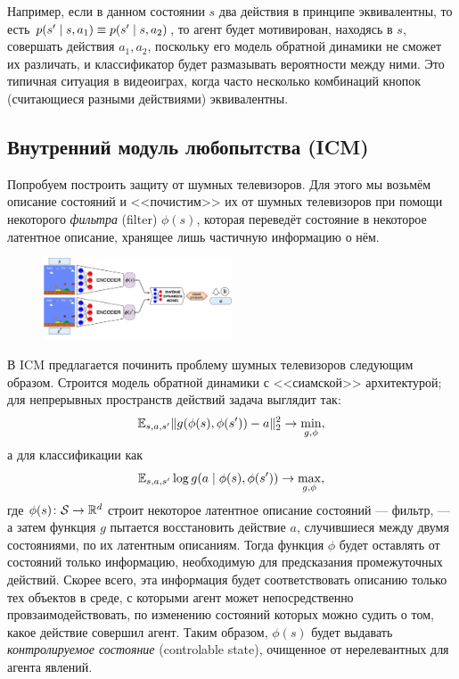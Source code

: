 \begin{example}
Например, если в данном состоянии $s$ два действия в принципе эквивалентны, то есть $p(s' \HM\mid s, a_1) \HM\equiv p(s' \HM\mid s, a_2)$, то агент будет мотивирован, находясь в $s$, совершать действия $a_1, a_2$, поскольку его модель обратной динамики не сможет их различать, и классификатор будет размазывать вероятности между ними. Это типичная ситуация в видеоиграх, когда часто несколько комбинаций кнопок (считающиеся разными действиями) эквивалентны.
\end{example}

\subsection{Внутренний модуль любопытства (ICM)}

Попробуем построить защиту от шумных телевизоров. Для этого мы возьмём описание состояний и <<почистим>> их от шумных телевизоров при помощи некоторого \emph{фильтра} (filter) $\phi(s)$, которая переведёт состояние в некоторое латентное описание, хранящее лишь частичную информацию о нём.

\begin{figure}
\centering
\includegraphics[width=0.5\textwidth]{Images/inversemodel.png}
\vspace{-0.7cm}
\end{figure}

В ICM предлагается починить проблему шумных телевизоров следующим образом. Строится модель обратной динамики с <<сиамской>> архитектурой; для непрерывных пространств действий задача выглядит так:
$$\mathbb{E}_{s, a, s'} \|g(\phi(s), \phi(s')) - a\|^2_2 \to \min_{g, \phi},$$
а для классификации как
$$\mathbb{E}_{s, a, s'} \log g(a \mid \phi(s), \phi(s')) \to \max_{g, \phi},$$
где $\phi(s) \colon \mathcal{S} \to \mathbb{R}^d$ строит некоторое латентное описание состояний --- фильтр, --- а затем функция $g$ пытается восстановить действие $a$, случившиеся между двумя состояниями, по их латентным описаниям. Тогда функция $\phi$ будет оставлять от состояний только информацию, необходимую для предсказания промежуточных действий. Скорее всего, эта информация будет соответствовать описанию только тех объектов в среде, с которыми агент может непосредственно провзаимодействовать, по изменению состояний которых можно судить о том, какое действие совершил агент. Таким образом, $\phi(s)$ будет выдавать \emph{контролируемое состояние} (controlable state), очищенное от нерелевантных для агента явлений.

